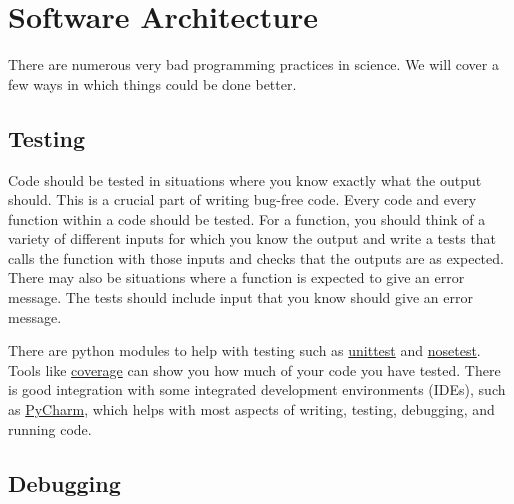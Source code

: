 
\chapter{Software Architecture}

There are numerous very bad programming practices in science. We will
cover a few ways in which things could be done better. 




\section{Testing\label{sec:testing}}

Code should be tested in situations where you know exactly what the
output should. This is a crucial part of writing bug-free code. Every
code and every function within a code should be tested. For a function,
you should think of a variety of different inputs for which you know
the output and write a tests that calls the function with those inputs
and checks that the outputs are as expected. There may also be situations
where a function is expected to give an error message. The tests should
include input that you know should give an error message.

There are python modules to help with testing such as \url{unittest}
and \url{nosetest}. Tools like \url{coverage} can show you how much
of your code you have tested. There is good integration with some
integrated development environments (IDEs), such as \url{PyCharm},
which helps with most aspects of writing, testing, debugging, and
running code.

\clearpage{}


\section{Debugging}

